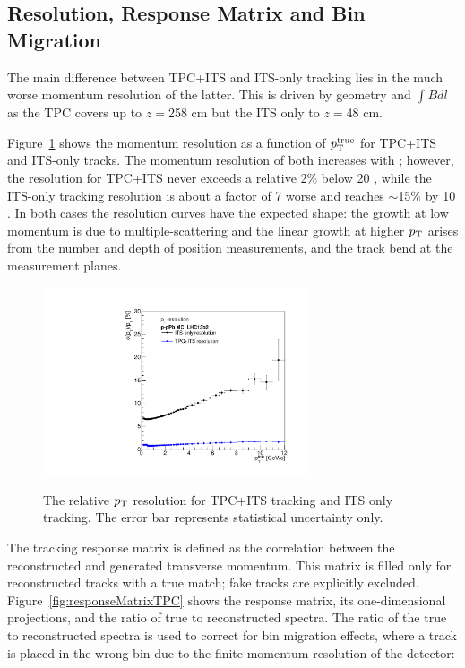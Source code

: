 \subsection{Resolution, Response Matrix and Bin Migration}
The main difference between TPC+ITS and ITS-only tracking lies in the much worse momentum resolution of the latter. This is driven by geometry 
and $\int Bdl$ as the TPC covers up to {$z=$258 cm} but the ITS only to {$z=$48 cm}. 

Figure~\ref{fig:resolution} shows the momentum resolution as a function of $p_{\mathrm{T}}^{\mathrm{true}}$ for 
TPC+ITS and ITS-only tracks. The momentum resolution of both increases with \pt; however, the resolution for TPC+ITS never exceeds a relative 2\% below 20 \GeVc, while the ITS-only tracking resolution is about a factor of 7 worse and reaches $\sim$15\% by 10 \GeVc. In both cases the resolution curves have the expected shape: the growth at low momentum is due to multiple-scattering and the linear growth at higher $p_{\mathrm{T}}$ arises from the number and depth of position measurements, and the track bend at the measurement planes. 
\begin{figure}[h]
\center
\includegraphics[width=0.7\textwidth]{Data_Analysis/Tracking/HybridAndITS_resolution_lowpt.pdf}\\
\caption{The relative $p_{\mathrm{T}}$ resolution for TPC+ITS tracking and ITS only tracking. The error bar represents statistical uncertainty only.}
\label{fig:resolution}
\end{figure}

The tracking response matrix is defined as the correlation between the reconstructed and generated transverse momentum. This matrix is filled only for reconstructed tracks with a true match; fake tracks are explicitly excluded. Figure~\ref{fig:responseMatrixTPC} shows the response matrix, its one-dimensional projections, and the ratio of true to reconstructed spectra. The ratio of the true to reconstructed spectra is used to correct for bin migration effects, where a track is placed in the wrong \pt bin due to the finite momentum resolution of the detector:

